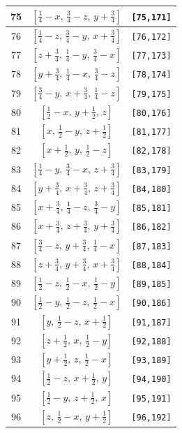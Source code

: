 \documentclass[fleqn,8pt]{jsarticle}
\begin{document}
\begin{longtable}{ccc}
75 & $\left[ \frac{1}{4} - x,\, \frac{3}{4} - z,\, y + \frac{3}{4} \right]$ & {\tt [75,171]} \\ \hline
76 & $\left[ \frac{1}{4} - z,\, \frac{3}{4} - y,\, x + \frac{3}{4} \right]$ & {\tt [76,172]} \\ \hline
77 & $\left[ z + \frac{3}{4},\, \frac{1}{4} - y,\, \frac{3}{4} - x \right]$ & {\tt [77,173]} \\ \hline
78 & $\left[ y + \frac{3}{4},\, \frac{1}{4} - x,\, \frac{3}{4} - z \right]$ & {\tt [78,174]} \\ \hline
79 & $\left[ \frac{3}{4} - y,\, x + \frac{3}{4},\, \frac{1}{4} - z \right]$ & {\tt [79,175]} \\ \hline
80 & $\left[ \frac{1}{2} - x,\, y + \frac{1}{2},\, z \right]$ & {\tt [80,176]} \\ \hline
81 & $\left[ x,\, \frac{1}{2} - y,\, z + \frac{1}{2} \right]$ & {\tt [81,177]} \\ \hline
82 & $\left[ x + \frac{1}{2},\, y,\, \frac{1}{2} - z \right]$ & {\tt [82,178]} \\ \hline
83 & $\left[ \frac{1}{4} - y,\, \frac{3}{4} - x,\, z + \frac{3}{4} \right]$ & {\tt [83,179]} \\ \hline
84 & $\left[ y + \frac{3}{4},\, x + \frac{3}{4},\, z + \frac{3}{4} \right]$ & {\tt [84,180]} \\ \hline
85 & $\left[ x + \frac{3}{4},\, \frac{1}{4} - z,\, \frac{3}{4} - y \right]$ & {\tt [85,181]} \\ \hline
86 & $\left[ x + \frac{3}{4},\, z + \frac{3}{4},\, y + \frac{3}{4} \right]$ & {\tt [86,182]} \\ \hline
87 & $\left[ \frac{3}{4} - z,\, y + \frac{3}{4},\, \frac{1}{4} - x \right]$ & {\tt [87,183]} \\ \hline
88 & $\left[ z + \frac{3}{4},\, y + \frac{3}{4},\, x + \frac{3}{4} \right]$ & {\tt [88,184]} \\ \hline
89 & $\left[ \frac{1}{2} - z,\, \frac{1}{2} - x,\, \frac{1}{2} - y \right]$ & {\tt [89,185]} \\ \hline
90 & $\left[ \frac{1}{2} - y,\, \frac{1}{2} - z,\, \frac{1}{2} - x \right]$ & {\tt [90,186]} \\ \hline
91 & $\left[ y,\, \frac{1}{2} - z,\, x + \frac{1}{2} \right]$ & {\tt [91,187]} \\ \hline
92 & $\left[ z + \frac{1}{2},\, x,\, \frac{1}{2} - y \right]$ & {\tt [92,188]} \\ \hline
93 & $\left[ y + \frac{1}{2},\, z,\, \frac{1}{2} - x \right]$ & {\tt [93,189]} \\ \hline
94 & $\left[ \frac{1}{2} - z,\, x + \frac{1}{2},\, y \right]$ & {\tt [94,190]} \\ \hline
95 & $\left[ \frac{1}{2} - y,\, z + \frac{1}{2},\, x \right]$ & {\tt [95,191]} \\ \hline
96 & $\left[ z,\, \frac{1}{2} - x,\, y + \frac{1}{2} \right]$ & {\tt [96,192]} \\
\end{longtable}
\end{document}

